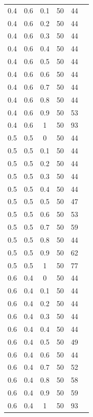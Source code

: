 \documentclass[12pt]{report}
\begin{document}
\begin{table}
\begin{minipage}[!h]{0.50\hsize}
\begin{center}
{\begin{tabular}{c@{\hspace{5mm}}c@{\hspace{5mm}}c@{\hspace{5mm}}c@{\hspace{5mm}}c@{\hspace{5mm}}c}
				0.4     &0.6    &0.1    &50    &44\\
				0.4     &0.6    &0.2    &50    &44\\
				0.4     &0.6    &0.3    &50    &44\\
				0.4     &0.6    &0.4    &50    &44\\
				0.4     &0.6    &0.5    &50    &44\\
				0.4     &0.6    &0.6    &50    &44\\
				0.4     &0.6    &0.7    &50    &44\\
				0.4     &0.6    &0.8    &50    &44\\
				0.4     &0.6    &0.9    &50    &53\\
				0.4     &0.6    &1      &50     &93\\
				\midrule
				0.5     &0.5    &0      &50    &44\\
				0.5     &0.5    &0.1    &50    &44\\
				0.5     &0.5    &0.2    &50    &44\\
				0.5     &0.5    &0.3    &50    &44\\
				0.5     &0.5    &0.4    &50    &44\\
				0.5     &0.5    &0.5    &50    &47\\
				0.5     &0.5    &0.6    &50    &53\\
				0.5     &0.5    &0.7    &50    &59\\
				0.5     &0.5    &0.8    &50    &44\\
				0.5     &0.5    &0.9    &50   &62\\
				0.5     &0.5    &1      &50    &77\\
				\midrule
				0.6     &0.4    &0      &50    &44\\
				0.6     &0.4    &0.1    &50    &44\\
				0.6     &0.4    &0.2    &50    &44\\
				0.6     &0.4    &0.3    &50    &44\\
				0.6     &0.4    &0.4    &50    &44\\
				0.6     &0.4    &0.5    &50    &49\\
				0.6     &0.4    &0.6    &50    &44\\
				0.6     &0.4    &0.7    &50   &52\\
				0.6     &0.4    &0.8    &50    &58\\
				0.6     &0.4    &0.9    &50    &59\\
				0.6     &0.4    &1      &50    &93\\

\end{tabular}}
\end{center}
\end{minipage}
\end{table}
\end{document}
